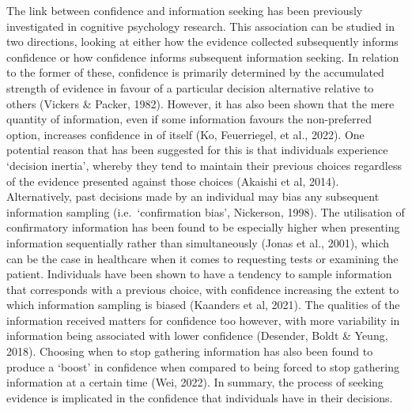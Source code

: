\documentclass[a4paper, nobind]{templates/ociamthesis}
\begin{document}
The link between confidence and information seeking has been previously investigated in cognitive psychology research. This association can be studied in two directions, looking at either how the evidence collected subsequently informs confidence or how confidence informs subsequent information seeking. In relation to the former of these, confidence is primarily determined by the accumulated strength of evidence in favour of a particular decision alternative relative to others (Vickers \& Packer, 1982). However, it has also been shown that the mere quantity of information, even if some information favours the non-preferred option, increases confidence in of itself (Ko, Feuerriegel, et al., 2022). One potential reason that has been suggested for this is that individuals experience `decision inertia', whereby they tend to maintain their previous choices regardless of the evidence presented against those choices (Akaishi et al, 2014). Alternatively, past decisions made by an individual may bias any subsequent information sampling (i.e.~`confirmation bias', Nickerson, 1998). The utilisation of confirmatory information has been found to be especially higher when presenting information sequentially rather than simultaneously (Jonas et al., 2001), which can be the case in healthcare when it comes to requesting tests or examining the patient. Individuals have been shown to have a tendency to sample information that corresponds with a previous choice, with confidence increasing the extent to which information sampling is biased (Kaanders et al, 2021). The qualities of the information received matters for confidence too however, with more variability in information being associated with lower confidence (Desender, Boldt \& Yeung, 2018). Choosing when to stop gathering information has also been found to produce a `boost' in confidence when compared to being forced to stop gathering information at a certain time (Wei, 2022). In summary, the process of seeking evidence is implicated in the confidence that individuals have in their decisions.
\end{document}
